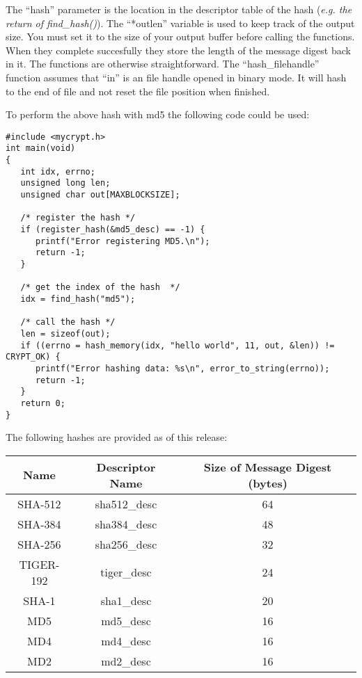 \documentclass{book}
\begin{document}
The ``hash'' parameter is the location in the descriptor table of the hash (\textit{e.g. the return of find\_hash()}).  
The ``*outlen'' variable is used to keep track of the output size.  You
must set it to the size of your output buffer before calling the functions.  When they complete succesfully they store
the length of the message digest back in it.  The functions are otherwise straightforward.  The ``hash\_filehandle'' 
function assumes that ``in'' is an file handle opened in binary mode.  It will hash to the end of file and not reset
the file position when finished.

To perform the above hash with md5 the following code could be used:
\begin{small}
\begin{verbatim}
#include <mycrypt.h>
int main(void)
{
   int idx, errno;
   unsigned long len;
   unsigned char out[MAXBLOCKSIZE];

   /* register the hash */
   if (register_hash(&md5_desc) == -1) {
      printf("Error registering MD5.\n");
      return -1;
   }

   /* get the index of the hash  */
   idx = find_hash("md5");

   /* call the hash */
   len = sizeof(out);
   if ((errno = hash_memory(idx, "hello world", 11, out, &len)) != CRYPT_OK) {
      printf("Error hashing data: %s\n", error_to_string(errno));
      return -1;
   }
   return 0;
}
\end{verbatim}
\end{small}

The following hashes are provided as of this release:
\begin{center}
\begin{tabular}{|c|c|c|}
      \hline Name & Descriptor Name & Size of Message Digest (bytes) \\
      \hline SHA-512 & sha512\_desc & 64 \\
      \hline SHA-384 & sha384\_desc & 48 \\
      \hline SHA-256 & sha256\_desc & 32 \\
      \hline TIGER-192 & tiger\_desc & 24 \\
      \hline SHA-1 & sha1\_desc & 20 \\
      \hline MD5 & md5\_desc & 16 \\
      \hline MD4 & md4\_desc & 16 \\
      \hline MD2 & md2\_desc & 16 \\
      \hline
\end{tabular}
\end{center}
\end{document}
